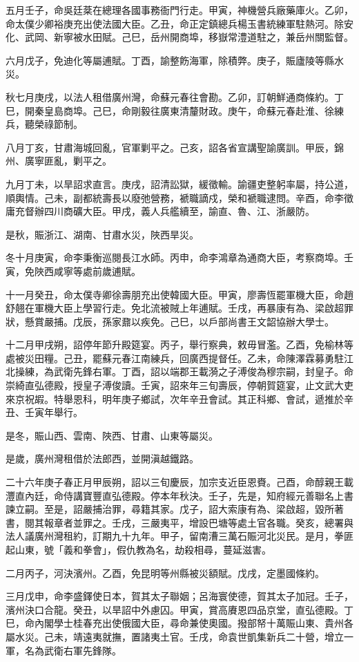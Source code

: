 \begin{pinyinscope}
五月壬子，命吳廷棻在總理各國事務衙門行走。甲寅，神機營兵廠藥庫火。乙卯，命太僕少卿裕庚充出使法國大臣。乙丑，命正定鎮總兵楊玉書統練軍駐熱河。除安化、武岡、新寧被水田賦。己巳，岳州開商埠，移嶽常澧道駐之，兼岳州關監督。

六月戊子，免迪化等屬逋賦。丁酉，諭整飭海軍，除積弊。庚子，賑廬陵等縣水災。

秋七月庚戌，以法人租借廣州灣，命蘇元春往會勘。乙卯，訂朝鮮通商條約。丁巳，開秦皇島商埠。己巳，命剛毅往廣東清釐財政。庚午，命蘇元春赴淮、徐練兵，聽榮祿節制。

八月丁亥，甘肅海城回亂，官軍剿平之。己亥，詔各省宣講聖諭廣訓。甲辰，錦州、廣寧匪亂，剿平之。

九月丁未，以旱詔求直言。庚戌，詔清訟獄，緩徵輸。諭疆吏整躬率屬，持公道，順輿情。己未，副都統壽長以廢弛營務，褫職謫戍，榮和褫職逮問。辛酉，命李徵庸充督辦四川商礦大臣。甲戌，義人兵艦續至，諭直、魯、江、浙嚴防。

是秋，賑浙江、湖南、甘肅水災，陜西旱災。

冬十月庚寅，命李秉衡巡閱長江水師。丙申，命李鴻章為通商大臣，考察商埠。壬寅，免陜西咸寧等處前歲逋賦。

十一月癸丑，命太僕寺卿徐壽朋充出使韓國大臣。甲寅，廖壽恆罷軍機大臣，命趙舒翹在軍機大臣上學習行走。免北流被賊上年逋賦。壬戌，再暴康有為、梁啟超罪狀，懸賞嚴捕。戊辰，孫家鼐以疾免。己巳，以戶部尚書王文韶協辦大學士。

十二月甲戌朔，詔停年節升殿筵宴。丙子，舉行察典，敕毋冒濫。乙酉，免榆林等處被災田糧。己丑，罷蘇元春江南練兵，回廣西提督任。乙未，命陳澤霖募勇駐江北操練，為武衛先鋒右軍。丁酉，詔以端郡王載漪之子溥俊為穆宗嗣，封皇子。命崇綺直弘德殿，授皇子溥俊讀。壬寅，詔來年三旬壽辰，停朝賀筵宴，止文武大吏來京祝嘏。特舉恩科，明年庚子鄉試，次年辛丑會試。其正科鄉、會試，遞推於辛丑、壬寅年舉行。

是冬，賑山西、雲南、陜西、甘肅、山東等屬災。

是歲，廣州灣租借於法郎西，並開滇越鐵路。

二十六年庚子春正月甲辰朔，詔以三旬慶辰，加宗支近臣恩賚。己酉，命醇親王載灃直內廷，命侍講寶豐直弘德殿。停本年秋決。壬子，先是，知府經元善聯名上書諫立嗣。至是，詔嚴捕治罪，尋籍其家。戊子，詔大索康有為、梁啟超，毀所著書，閱其報章者並罪之。壬戌，三嚴夷平，增設巴塘等處土官各職。癸亥，總署與法人議廣州灣租約，訂期九十九年。甲子，留南漕三萬石賑河北災民。是月，拳匪起山東，號「義和拳會」，假仇教為名，劫殺相尋，蔓延滋害。

二月丙子，河決濱州。乙酉，免昆明等州縣被災額賦。戊戌，定墨國條約。

三月戊申，命李盛鐸使日本，賀其太子聯姻；呂海寰使德，賀其太子加冠。壬子，濱州決口合龍。癸丑，以旱詔中外慮囚。甲寅，賞高賡恩四品京堂，直弘德殿。丁巳，命內閣學士桂春充出使俄國大臣，尋命兼使奧國。撥部帑十萬賑山東、貴州各屬水災。己未，靖遠夷就撫，置諸夷土官。壬戌，命袁世凱集新兵二十營，增立一軍，名為武衛右軍先鋒隊。


\end{pinyinscope}
